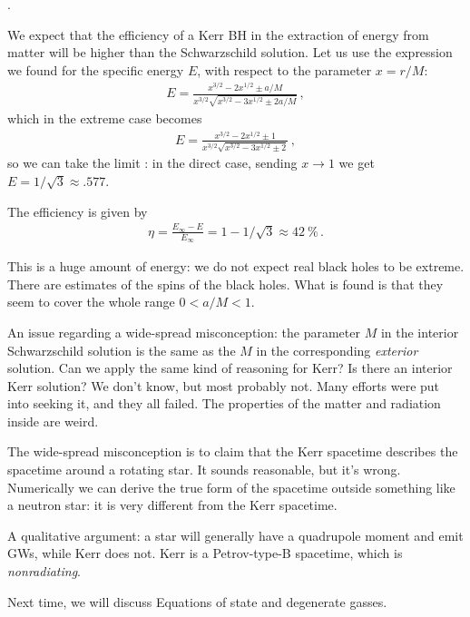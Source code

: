 \documentclass[main.tex]{subfiles}
\begin{document}
. 

We expect that the efficiency of a Kerr BH in the extraction of energy from matter will be higher than the Schwarzschild solution. 
Let us use the expression we found for the specific energy \(E\), with respect to the parameter \(x = r/M\): 
%
\begin{align}
E = \frac{x^{3/2} - 2 x^{1/2} \pm a/M}{x^{3/2} \sqrt{x^{3/2} - 3x^{1/2} \pm 2a /M}}
\,,
\end{align}
%
which in the extreme case becomes 
%
\begin{align}
E = \frac{x^{3/2} - 2 x^{1/2} \pm 1}{x^{3/2} \sqrt{x^{3/2 }- 3 x^{1/2} \pm 2}}
\,,
\end{align}
%
so we can take the limit : in the direct case, sending \(x \to 1\) we get \(E = 1 / \sqrt{3} \approx \num{.577}\). 

The efficiency is given by 
%
\begin{align}
\eta = \frac{E_\infty  - E}{E_{\infty }} = 1 - 1 / \sqrt{3} \approx \SI{42}{\percent}
\,.
\end{align}

This is a huge amount of energy: we do not expect real black holes to be extreme. 
There are estimates of the spins of the black holes. 
What is found is that they seem to cover the whole range \(0 < a/ M < 1\). 

An issue regarding a wide-spread misconception: the parameter \(M\) in the interior Schwarzschild solution is the same as the \(M\) in the corresponding \emph{exterior} solution. Can we apply the same kind of reasoning for Kerr?
Is there an interior Kerr solution? 
We don't know, but most probably not. 
Many efforts were put into seeking it, and they all failed. 
The properties of the matter and radiation inside are weird. 

The wide-spread misconception is to claim that the Kerr spacetime describes the spacetime around a rotating star. 
It sounds reasonable, but it's wrong. 
Numerically we can derive the true form of the spacetime outside something like a neutron star: it is very different from the Kerr spacetime. 

A qualitative argument: a star will generally have a quadrupole moment and emit GWs, while Kerr does not. 
Kerr is a Petrov-type-B spacetime, which is \emph{nonradiating}. 


Next time, we will discuss Equations of state and degenerate gasses.
\end{document}
